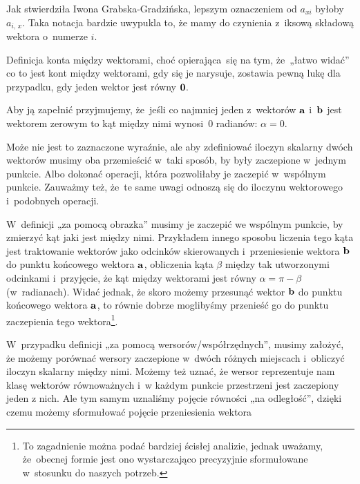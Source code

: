 \documentclass[a4paper,11pt]{article}
\numberwithin{equation}{section}
\begin{document}
\noindent
{} Jak stwierdziła Iwona Grabska-Gradzińska, lepszym
oznaczeniem od $a_{ xi }$ byłoby $a_{ i,\, x }$. Taka notacja bardzie uwypukla
to, że mamy do czynienia z~iksową składową wektora o~numerze $i$.

\vspace{\spaceFour}





\noindent
{} Definicja konta między wektorami, choć opierająca~się na tym,
że~„łatwo widać” co to jest kont między wektorami, gdy się je narysuje,
zostawia pewną lukę dla przypadku, gdy jeden wektor jest równy
$\mathbf{0}$.

Aby ją zapełnić przyjmujemy, że~jeśli co najmniej jeden z~wektorów
$\mathbf{a}$ i~$\mathbf{b}$ jest wektorem zerowym to kąt między nimi
wynosi~$0$ radianów: $\alpha = 0$.

\vspace{\spaceFour}





\noindent
{} Może nie jest to zaznaczone wyraźnie, ale aby zdefiniować iloczyn
skalarny dwóch wektorów musimy oba przemieścić w~taki sposób, by były
zaczepione w~jednym punkcie. Albo dokonać operacji, która pozwoliłaby je
zaczepić w~wspólnym punkcie. Zauważmy też, że~te same uwagi odnoszą się do
iloczynu wektorowego i~podobnych operacji.

W~definicji „za pomocą obrazka” musimy je zaczepić we wspólnym punkcie, by
zmierzyć kąt jaki jest między nimi. Przykładem innego sposobu liczenia tego
kąta jest traktowanie wektorów jako odcinków skierowanych i~przeniesienie
wektora $\mathbf{b}$ do punktu końcowego wektora $\mathbf{a}$, obliczenia kąta
$\beta$ między tak utworzonymi odcinkami i~przyjęcie, że kąt między wektorami
jest równy $\alpha = \pi - \beta$ (w~radianach). Widać jednak, że skoro możemy
przesunąć wektor $\mathbf{b}$ do punktu końcowego wektora $\mathbf{a}$, to
równie dobrze moglibyśmy przenieść go do punktu zaczepienia tego
wektora\footnote{To zagadnienie można podać bardziej ścisłej analizie,
  jednak uważamy, że~obecnej formie jest ono wystarczająco precyzyjnie
  sformułowane w~stosunku do naszych potrzeb.}.

W~przypadku definicji „za pomocą wersorów/współrzędnych”, musimy założyć, że
możemy porównać wersory zaczepione w~dwóch różnych miejscach i~obliczyć
iloczyn skalarny między nimi. Możemy też uznać, że wersor reprezentuje nam
klasę wektorów równoważnych i~w każdym punkcie przestrzeni jest zaczepiony
jeden z nich. Ale tym samym uznaliśmy pojęcie równości „na odległość”,
dzięki czemu możemy sformułować pojęcie przeniesienia wektora
\end{document}
